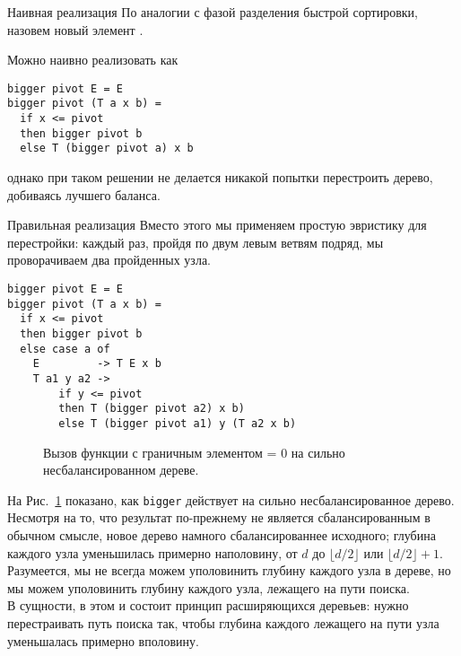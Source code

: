 \begin{frame}[fragile]{Наивная реализация }
По аналогии с фазой разделения быстрой сортировки,
назовем новый элемент .

Можно наивно реализовать  как

\begin{verbatim}
bigger pivot E = E
bigger pivot (T a x b) =
  if x <= pivot 
  then bigger pivot b
  else T (bigger pivot a) x b
\end{verbatim}
однако при таком решении не делается никакой попытки перестроить
дерево, добиваясь лучшего баланса.
\end{frame}

\begin{frame}[fragile]{Правильная реализация  }
Вместо этого мы применяем простую
эвристику для перестройки: каждый раз, пройдя по двум левым ветвям
подряд, мы проворачиваем два пройденных узла.

\begin{verbatim}
bigger pivot E = E
bigger pivot (T a x b) =
  if x <= pivot 
  then bigger pivot b
  else case a of
    E         -> T E x b
    T a1 y a2 ->
        if y <= pivot 
        then T (bigger pivot a2) x b)
        else T (bigger pivot a1) y (T a2 x b)
\end{verbatim} 
\end{frame}

\begin{frame}[fragile]{}
\begin{figure}
  \centering
  
  \caption{Вызов функции  с граничным элементом  = 0 на сильно несбалансированном дереве.}
  \label{fig:5.4}
\end{figure}


\end{frame}

\begin{frame}[fragile]{}
На Рис.~\ref{fig:5.4} показано, как \lstinline!bigger! действует на
сильно несбалансированное дерево. \\

Несмотря на то, что результат
по-прежнему не является сбалансированным в обычном смысле, новое
дерево намного сбалансированнее исходного; глубина каждого узла
уменьшилась примерно наполовину, от $d$ до $\lfloor d/2 \rfloor$ или
$\lfloor d/2 \rfloor + 1$.\\

Разумеется, мы не всегда можем уполовинить
глубину каждого узла в дереве, но мы можем уполовинить глубину каждого
узла, лежащего на пути поиска. \\

В сущности, в этом и состоит принцип
расширяющихся деревьев: нужно перестраивать путь поиска так, чтобы
глубина каждого лежащего на пути узла уменьшалась примерно вполовину.
\end{frame}

